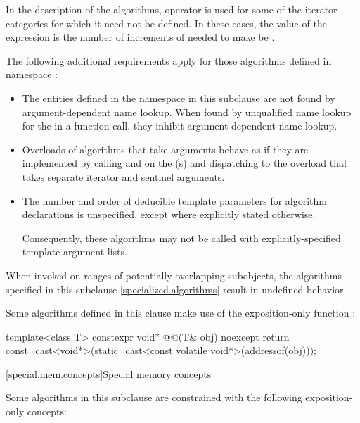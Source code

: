 \pnum
In the description of the algorithms, operator \tcode{-}
is used for some of the iterator categories for which
it need not be defined.
In these cases, the value of the expression 
is the number of increments of  needed to make
 be .

\pnum
The following additional requirements apply for those algorithms
defined in namespace :
\begin{itemize}
\item The entities defined in the  namespace
  in this subclause are not found by argument-dependent
  name lookup. When found by
  unqualified name lookup for the
   in a function call, they
  inhibit argument-dependent name lookup.
\item Overloads of algorithms that take  arguments
  behave as if they are implemented by calling 
  and  on the (s) and dispatching to the
  overload that takes separate iterator and sentinel arguments.
\item The number and order of deducible template parameters for algorithm declarations
  is unspecified, except where explicitly stated otherwise.
  \begin{note}
  Consequently, these algorithms may not be called with
  explicitly-specified template argument lists.
  \end{note}
\end{itemize}

\pnum
\begin{note}
When invoked on ranges of
potentially overlapping subobjects,
the algorithms specified in this subclause \ref{specialized.algorithms}
result in undefined behavior.
\end{note}

\pnum
Some algorithms defined in this clause make use of the exposition-only function
:
\begin{codeblock}
template<class T>
  constexpr void* @@(T& obj) noexcept {
    return const_cast<void*>(static_cast<const volatile void*>(addressof(obj)));
  }
\end{codeblock}

[special.mem.concepts]{Special memory concepts}

\pnum
Some algorithms in this subclause are constrained with the following
exposition-only concepts:

